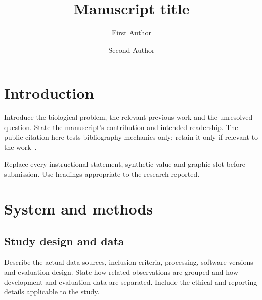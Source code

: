 \documentclass[unnumsec,webpdf,contemporary,large,namedate]{oup-authoring-template}
\begin{document}
\DOI{}
\copyrightyear{}
\pubyear{}

\title[Short manuscript title]{Manuscript title}
\author[1,$\ast$]{First Author}
\author[1,2]{Second Author}
\address[1]{, ,
  }
\address[2]{, ,
  }

\maketitle
\thispagestyle{plain}
\pagestyle{plain}

\section{Introduction}\label{sec:introduction}
Introduce the biological problem, the relevant previous work and the
unresolved question. State the manuscript's contribution and intended
readership. The public citation here tests bibliography mechanics only;
retain it only if relevant to the work~\citep{wilkinson2016fair}.

Replace every instructional statement, synthetic value and graphic slot
before submission. Use headings appropriate to the research reported.

\section{System and methods}\label{sec:methods}
\subsection{Study design and data}
Describe the actual data sources, inclusion criteria, processing, software
versions and evaluation design. State how related observations are grouped
and how development and evaluation data are separated. Include the ethical
and reporting details applicable to the study.
\end{document}
